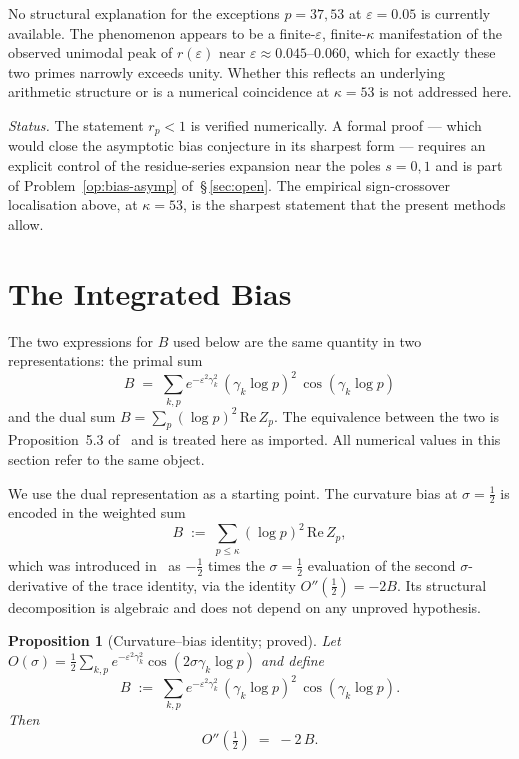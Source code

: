 \documentclass[11pt]{article}
\newtheorem{proposition}[theorem]{Proposition}
\begin{document}
No structural explanation for the exceptions $p=37,53$ at
$\varepsilon=0.05$ is currently available.
The phenomenon appears to be a finite-$\varepsilon$, finite-$\kappa$
manifestation of the observed unimodal peak of $r(\varepsilon)$ near
$\varepsilon\approx 0.045$--$0.060$, which for exactly these two
primes narrowly exceeds unity.
Whether this reflects an underlying arithmetic structure or is a
numerical coincidence at $\kappa=53$ is not addressed here.

\emph{Status.}
The statement $r_p<1$ is verified numerically.
A formal proof --- which would close the asymptotic bias conjecture in
its sharpest form --- requires an explicit control of the
residue-series expansion near the poles $s=0,1$ and is part of
Problem~\ref{op:bias-asymp} of~\S\,\ref{sec:open}.
The empirical sign-crossover localisation above, at $\kappa=53$, is
the sharpest statement that the present methods allow.

\section{The Integrated Bias}
\label{sec:intbias}

The two expressions for $B$ used below are the same quantity in two
representations: the primal sum
\[
B \;=\; \sum_{k,p} e^{-\varepsilon^2\gamma_k^2}\,(\gamma_k\log p)^2\,
         \cos(\gamma_k\log p)
\]
and the dual sum $B=\sum_p(\log p)^2\,\mathrm{Re}\,Z_p$.
The equivalence between the two is Proposition~5.3 of~\cite{Paper5}
and is treated here as imported.
All numerical values in this section refer to the same object.

We use the dual representation as a starting point.
The curvature bias at $\sigma=\tfrac12$ is encoded in the weighted sum
\[
B \;:=\; \sum_{p\le\kappa}(\log p)^2\,\mathrm{Re}\,Z_p,
\]
which was introduced in~\cite{Paper5} as $-\tfrac12$ times the
$\sigma=\tfrac12$ evaluation of the second $\sigma$-derivative of the
trace identity, via the identity $O''(\tfrac12)=-2B$.
Its structural decomposition is algebraic and does not depend on any
unproved hypothesis.

\begin{proposition}[Curvature--bias identity; proved]
\label{prop:curv-bias}
Let $O(\sigma)=\tfrac12\sum_{k,p} e^{-\varepsilon^2\gamma_k^2}
\cos(2\sigma\gamma_k\log p)$ and define
\[
B \;:=\; \sum_{k,p} e^{-\varepsilon^2\gamma_k^2}\,(\gamma_k\log p)^2\,
         \cos(\gamma_k\log p).
\]
Then
\[
O''(\tfrac12) \;=\; -2\,B.
\]
\end{proposition}
\end{document}
